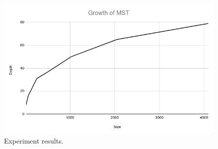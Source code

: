 \documentclass[12pt, a4paper]{article}
\begin{document}
\begin{figure}[H]
  \center
  \includegraphics[scale=0.4]{plot}
  \caption{Experiment results.}
  \label{fig:1}
\end{figure}




\end{document}
